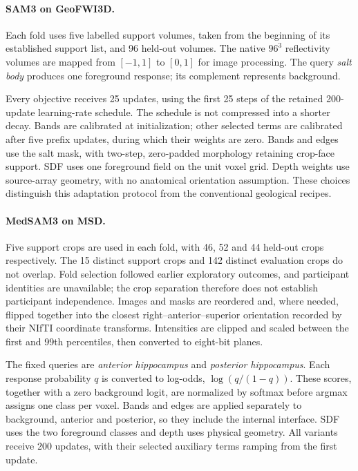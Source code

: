 \paragraph{SAM3 on GeoFWI3D.}\label{sec:sam3-methods}
Each fold uses five labelled support volumes, taken from the beginning
of its established support list, and 96 held-out volumes. The native
$96^3$ reflectivity volumes are mapped from $[-1,1]$ to $[0,1]$ for
image processing. The query \emph{salt body} produces one foreground
response; its complement represents background.

Every objective receives 25 updates, using the first 25 steps of the
retained 200-update learning-rate schedule. The schedule is not compressed
into a shorter decay. Bands are calibrated at initialization; other selected
terms are calibrated after five prefix updates, during which their weights
are zero. Bands and edges use the salt mask, with two-step, zero-padded
morphology retaining crop-face support. SDF uses one foreground field on the
unit voxel grid. Depth weights use source-array geometry, with no anatomical
orientation assumption. These choices distinguish this adaptation protocol
from the conventional geological recipes.

\paragraph{MedSAM3 on MSD.}\label{sec:medsam-methods}
Five support crops are used in each fold, with 46, 52 and 44 held-out
crops respectively. The 15 distinct support crops and 142 distinct
evaluation crops do not overlap. Fold selection followed earlier
exploratory outcomes, and participant identities are unavailable; the
crop separation therefore does not establish participant independence.
Images and masks are reordered and, where needed, flipped together
into the closest right--anterior--superior orientation recorded by their
NIfTI coordinate transforms. Intensities are clipped and scaled between the first and
99th percentiles, then converted to eight-bit planes.

The fixed queries are \emph{anterior hippocampus} and \emph{posterior
hippocampus}. Each response probability $q$ is converted to log-odds,
$\log(q/(1-q))$. These scores, together with a zero background logit, are
normalized by softmax before argmax assigns one class per voxel. Bands and
edges are applied separately to background, anterior and posterior, so they
include the internal interface. SDF uses the two foreground classes and
depth uses physical geometry. All variants receive 200 updates, with their
selected auxiliary terms ramping from the first update.

